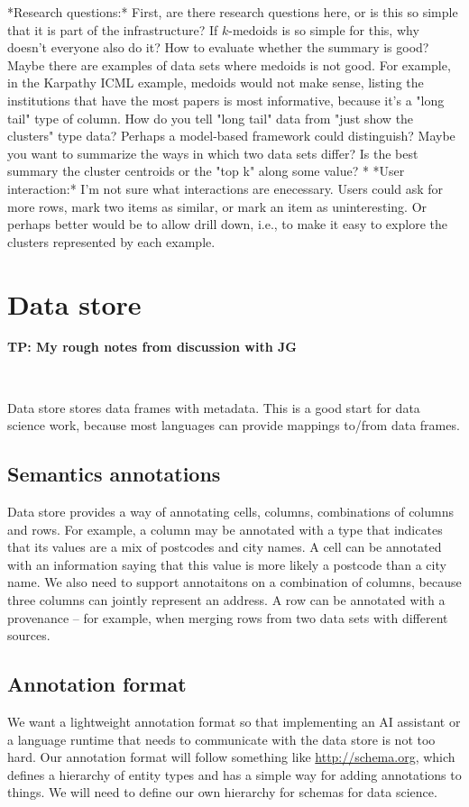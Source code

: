 \documentclass[sigplan,preprint,10pt]{acmart}\settopmatter{printfolios=true,printccs=false,printacmref=false}
\theoremstyle{plain}
\theoremstyle{definition}
\begin{document}
{*Research questions:* First, are there research questions here, or is this so simple
that it  is part of the infrastructure?  If $k$-medoids is so simple for this,
why doesn't everyone also do it? How to evaluate whether the summary is good?
Maybe there are examples of data sets where medoids is not good.
For example, in the Karpathy ICML example, medoids would not make sense,
listing the institutions that have the most papers is most informative, because
it's a "long tail" type of column. How do you tell "long tail" data from "just show
the clusters" type data? Perhaps a model-based framework could distinguish?
Maybe you want to summarize the ways in which two data sets differ?
Is the best summary the cluster centroids or the "top k" along some value? 
* *User interaction:* I'm not sure what interactions are enecessary.
Users could ask for more rows, mark two items as similar, or mark an item as uninteresting.
Or perhaps better would be to allow drill down, i.e., to make it easy to explore
the clusters represented by each example.
}

\section{Data store}
\label{sec:datastore}

{\color{red}
\textbf{TP: My rough notes from discussion with JG}

~

\noindent
Data store stores data frames with metadata. This is a good start for data science work,
because most languages can provide mappings to/from data frames.
}

\subsection{Semantics annotations}
{\color{red}
Data store provides a way of annotating cells, columns, combinations of columns and rows.
For example, a column may be annotated with a type that indicates that its values are a mix of
postcodes and city names. A cell can be annotated with an information saying that this value is 
more likely a postcode than a city name. We also need to support annotaitons on a combination of
columns, because three columns can jointly represent an address. A row can be annotated with a 
provenance -- for example, when merging rows from two data sets with different sources.
}

\subsection{Annotation format}
{\color{red}
We want a lightweight annotation format so that implementing an AI assistant or a language
runtime that needs to communicate with the data store is not too hard.
Our annotation format will follow something like \url{http://schema.org}, which defines
a hierarchy of entity types and has a simple way for adding annotations to things.
We will need to define our own hierarchy for schemas for data science.
}
\end{document}
